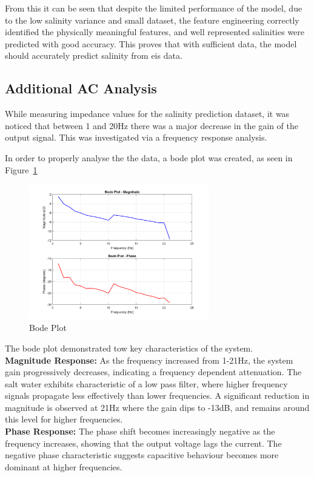 From this it can be seen that despite the limited performance of the model, due to the low salinity variance and small dataset, the feature engineering correctly identified the physically meaningful features, and well represented salinities were predicted with good accuracy.
This proves that with sufficient data, the model should accurately predict salinity from \gls{eis} data.

\subsection{Additional AC Analysis}
While measuring impedance values for the salinity prediction dataset, it was noticed that between 1 and 20Hz there was a major decrease in the gain of the output signal.
This was investigated via a frequency response analysis.

In order to properly analyse the the data, a bode plot was created, as seen in Figure~\ref{fig:bode}

\begin{figure}[H]
    \centering
    \includegraphics[width=0.7\textwidth]{figures/bode_plot.png}
    \caption{Bode Plot}
    \label{fig:bode}
\end{figure}

The bode plot demonstrated tow key characteristics of the system. \\
\textbf{Magnitude Response:} As the frequency increased from 1-21Hz, the system gain progressively decreases, indicating a frequency dependent attenuation.
The salt water exhibits characteristic of a low pass filter, where higher frequency signals propagate less effectively than lower frequencies.
A significant reduction in magnitude is observed at 21Hz where the gain dips to -13dB, and remains around this level for higher frequencies. \\
\textbf{Phase Response:} The phase shift becomes increasingly negative as the frequency increases, showing that the output voltage lags the current.
The negative phase characteristic suggests capacitive behaviour becomes more dominant at higher frequencies.


